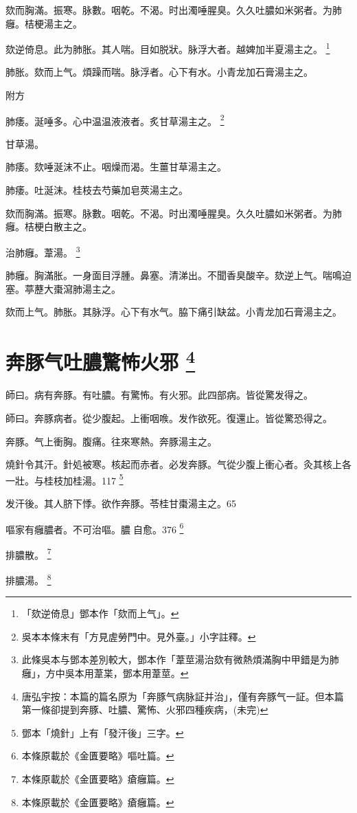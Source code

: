 欬而胸滿。振寒。脉數。咽乾。不渴。时出濁唾腥臭。久久吐膿如米粥者。为肺癰。桔梗湯主之。

欬逆倚息。此为肺胀。其人喘。目如脱狀。脉浮大者。越婢加半夏湯主之。
	\footnote{
		「欬逆倚息」鄧本作「欬而上气」。
	}

肺胀。欬而上气。煩躁而喘。脉浮者。心下有水。小青龙加石膏湯主之。

附方

肺痿。涎唾多。心中温温液液者。炙甘草湯主之。
	\footnote{
		吳本本條末有「方見虗勞門中。見外臺。」小字註釋。
	}

甘草湯。

肺痿。欬唾涎沫不止。咽燥而渴。生薑甘草湯主之。

肺痿。吐涎沫。桂枝去芍藥加皂莢湯主之。

欬而胸滿。振寒。脉數。咽乾。不渴。时出濁唾腥臭。久久吐膿如米粥者。为肺癰。桔梗白散主之。

治肺癰。葦湯。
	\footnote{
		此條吳本与鄧本差別較大，鄧本作「葦莖湯治欬有微熱煩滿胸中甲錯是为肺癰」，方中吳本用葦枼，鄧本用葦莖。
	}

肺癰。胸滿胀。一身面目浮腫。鼻塞。清涕出。不聞香臭酸辛。欬逆上气。喘鳴迫塞。葶藶大棗瀉肺湯主之。

欬而上气。肺胀。其脉浮。心下有水气。脇下痛引缺盆。小青龙加石膏湯主之。

\chapter{奔豚气吐膿驚怖火邪
	\footnote{
		唐弘宇按：本篇的篇名原为「奔豚气病脉証并治」，僅有奔豚气一証。但本篇第一條卻提到奔豚、吐膿、驚怖、火邪四種疾病，(未完)
	}
}

師曰。病有奔豚。有吐膿。有驚怖。有火邪。此四部病。皆從驚发得之。

師曰。奔豚病者。從少腹起。上衝咽㗋。发作欲死。復還止。皆從驚恐得之。

奔豚。气上衝胸。腹痛。往來寒熱。奔豚湯主之。

燒針令其汗。針処被寒。核起而赤者。必发奔豚。气從少腹上衝心者。灸其核上各一壯。与桂枝加桂湯。117
	\footnote{
		鄧本「燒針」上有「發汗後」三字。
	}

发汗後。其人脐下悸。欲作奔豚。苓桂甘棗湯主之。65

嘔家有癰膿者。不可治嘔。膿{\sungii 𥁞}自愈。376
	\footnote{
		本條原載於《金匱要略》嘔吐篇。
	}

排膿散。
	\footnote{
		本條原載於《金匱要略》瘡癰篇。
	}

排膿湯。
	\footnote{
		本條原載於《金匱要略》瘡癰篇。
	}

